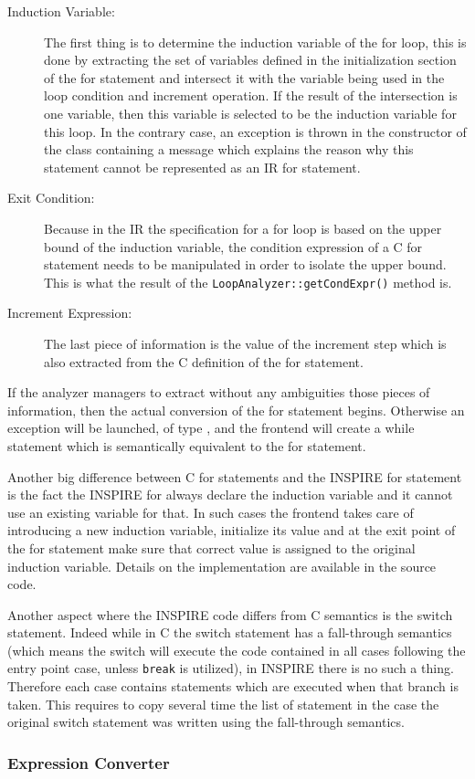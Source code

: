 \begin{description}
\item [Induction Variable:] The first thing is to determine the induction
variable of the for loop, this is done by extracting the set of  variables
defined in the initialization section of the for statement and intersect it with
the variable being used in the loop condition and increment operation. If the
result of the intersection is one variable, then this variable is selected to be
the induction variable for this loop. In the contrary case, an exception is
thrown in the constructor of the  class containing a message
which explains the reason why this statement cannot be represented as an IR for
statement. 

\item[Exit Condition:] Because in the IR the specification for a for loop is
based on the upper bound of the induction variable, the condition expression of a
C for statement needs to be manipulated in order to isolate the upper bound.
This is what the result of the {\tt LoopAnalyzer::getCondExpr()} method is. 

\item[Increment Expression:] The last piece of information is the value of the
increment step which is also extracted from the C definition of the for
statement. 

\end{description}

If the analyzer managers to extract without any ambiguities those pieces of
information, then the actual conversion of the for statement begins. Otherwise
an exception will be launched, of type
, and the frontend will create
a while statement which is semantically equivalent to the for statement.  

Another big difference between C for statements and the INSPIRE for statement is
the fact the INSPIRE for always declare the induction variable and it cannot use
an existing variable for that. In such cases the frontend takes care of
introducing a new induction variable, initialize its value and at the exit point
of the for statement make sure that correct value is assigned to the original
induction variable. Details on the implementation are available in the
source code. 

Another aspect where the INSPIRE code differs from C semantics is the switch
statement. Indeed while in C the switch statement has a fall-through semantics
(which means the switch will execute the code contained in all cases following
the entry point case, unless {\tt break} is utilized), in INSPIRE there is no
such a thing. Therefore each case contains statements which are executed when
that branch is taken. This requires to copy several time the list of statement
in the case the original switch statement was written using the fall-through
semantics. 

\subsubsection{Expression Converter}



